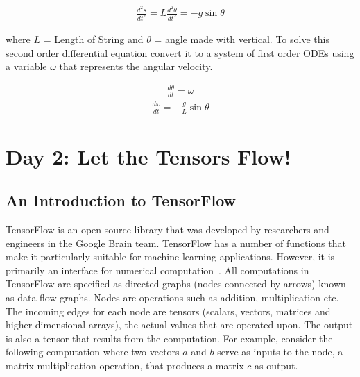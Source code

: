 \documentclass[10pt,letterpaper]{article}
\begin{document}
\begin{nolinenumbers}
\begin{eqnarray}\frac{d^2s}{dt^2}=L\frac{d^2\theta}{dt^2}=-g\sin{\theta}\end{eqnarray}

where $L$ = Length of String and $\theta$ = angle made with vertical. To solve this second order differential equation convert it to a system of first order ODEs using a variable $\omega$ that represents the angular velocity.

\begin{eqnarray}\frac{d\theta}{dt}=\omega \end{eqnarray}
\begin{eqnarray}\frac{d\omega}{dt}=-\frac{g}{L}\sin{\theta} \end{eqnarray}

\section*{Day 2: Let the Tensors Flow!}

\subsection*{An Introduction to TensorFlow}

TensorFlow is an open-source library that was developed by researchers and engineers in the Google Brain team. TensorFlow has a number of functions that make it particularly suitable for machine learning applications. However, it is primarily an interface for numerical computation~\cite {tensorflow2015-whitepaper}. All computations in TensorFlow are specified as directed graphs (nodes connected by arrows) known as data flow graphs. Nodes are operations such as addition, multiplication etc. The incoming edges for each node are tensors (scalars, vectors, matrices and higher dimensional arrays), the actual values that are operated upon. The output is also a tensor that results from the computation. For example, consider the following computation where two vectors $a$ and $b$ serve as inputs to the node, a matrix multiplication operation, that produces a matrix $c$ as output.


\end{nolinenumbers}
\end{document}
